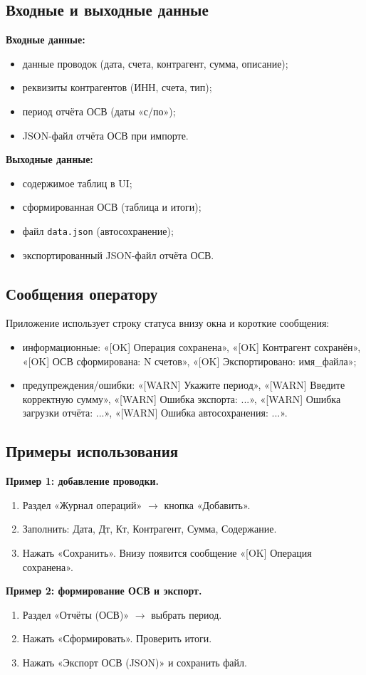 \documentclass[14pt,a4paper]{extarticle}
\begin{document}
\subsection{Входные и выходные данные}
\textbf{Входные данные:}
\begin{itemize}
    \item данные проводок (дата, счета, контрагент, сумма, описание);
    \item реквизиты контрагентов (ИНН, счета, тип);
    \item период отчёта ОСВ (даты «с/по»);
    \item JSON-файл отчёта ОСВ при импорте.
\end{itemize}
\textbf{Выходные данные:}
\begin{itemize}
    \item содержимое таблиц в UI;
    \item сформированная ОСВ (таблица и итоги);
    \item файл \texttt{data.json} (автосохранение);
    \item экспортированный JSON-файл отчёта ОСВ.
\end{itemize}

\subsection{Сообщения оператору}
Приложение использует строку статуса внизу окна и короткие сообщения:
\begin{itemize}
    \item информационные: «[OK] Операция сохранена», «[OK] Контрагент сохранён», «[OK] ОСВ сформирована: N счетов», «[OK] Экспортировано: имя\_файла»;
    \item предупреждения/ошибки: «[WARN] Укажите период», «[WARN] Введите корректную сумму», «[WARN] Ошибка экспорта: ...», «[WARN] Ошибка загрузки отчёта: ...», «[WARN] Ошибка автосохранения: ...».
\end{itemize}

\subsection{Примеры использования}
\textbf{Пример 1: добавление проводки.}
\begin{enumerate}
    \item Раздел «Журнал операций» \(\rightarrow\) кнопка «Добавить».
    \item Заполнить: Дата, Дт, Кт, Контрагент, Сумма, Содержание.
    \item Нажать «Сохранить». Внизу появится сообщение «[OK] Операция сохранена».
\end{enumerate}
\textbf{Пример 2: формирование ОСВ и экспорт.}
\begin{enumerate}
    \item Раздел «Отчёты (ОСВ)» \(\rightarrow\) выбрать период.
    \item Нажать «Сформировать». Проверить итоги.
    \item Нажать «Экспорт ОСВ (JSON)» и сохранить файл.
\end{enumerate}
\end{document}
